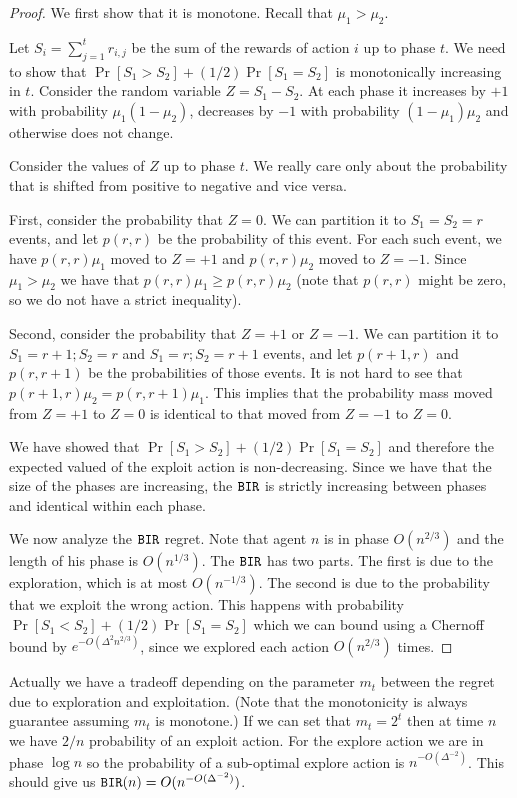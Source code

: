 \begin{proof}
We first show that it is monotone. Recall that $\mu_1>\mu_2$. 

Let
$S_i=\sum_{j=1}^t r_{i,j}$ be the sum of the rewards of action $i$
up to phase $t$. We need to show that $\Pr[S_1>S_2]+ (1/2)
\Pr[S_1=S_2]$ is monotonically increasing in $t$. Consider the
random variable $Z=S_1-S_2$. At each phase it increases by $+1$ with
probability $\mu_1(1-\mu_2)$, decreases by $-1$ with probability
$(1-\mu_1)\mu_2$ and otherwise does not change.

Consider the values of $Z$ up to phase $t$. We really care only
about the probability that is shifted from positive to negative and
vice versa.

First, consider the probability that $Z=0$. We can partition it to
$S_1=S_2=r$ events, and let $p(r,r)$ be the probability of this
event. For each such event, we have $p(r,r)\mu_1$ moved to $Z=+1$
and $p(r,r)\mu_2$ moved to $Z=-1$. Since $\mu_1>\mu_2$ we have that
$p(r,r)\mu_1\geq p(r,r)\mu_2$ (note that $p(r,r)$ might be zero, so
we do not have a strict inequality).

Second, consider the probability that $Z=+1$ or $Z=-1$. We can
partition it to $S_1=r+1;S_2=r$ and $S_1=r;S_2=r+1$ events, and let
$p(r+1,r)$ and $p(r,r+1)$ be the probabilities of those events.
%
It is not hard to see that $p(r+1,r)\mu_2=p(r,r+1)\mu_1$.
%
This implies that the probability mass moved from $Z=+1$ to $Z=0$ is
identical to that moved from $Z=-1$ to $Z=0$.

We have showed that $\Pr[S_1>S_2]+ (1/2) \Pr[S_1=S_2]$ and therefore
the expected valued of the exploit action is non-decreasing. Since
we have that the size of the phases are increasing, the $\mathtt{BIR}$ is
strictly increasing between phases and identical within each phase.

We now analyze the $\mathtt{BIR}$ regret. Note that agent $n$ is in phase
$O(n^{2/3})$ and the length of his phase is $O(n^{1/3})$. The $\mathtt{BIR}$
has two parts. The first is due to the exploration, which is at most
$O(n^{-1/3})$. The second is due to the probability that we exploit
the wrong action. This happens with probability $\Pr[S_1<S_2]+ (1/2)
\Pr[S_1=S_2]$ which we can bound using a Chernoff bound by
$e^{-O(\Delta^2n^{2/3})}$, since we explored each action
$O(n^{2/3})$ times.
\end{proof}

\begin{remark}
Actually we have a tradeoff depending on the parameter $m_t$ between
the regret due to exploration and exploitation. (Note that the
monotonicity is always guarantee assuming $m_t$ is monotone.) If we
can set that $m_t = 2^t$ then at time $n$ we have $2/ n$ probability
of an exploit action. For the explore action we are in phase $\log
n$ so the probability of a sub-optimal explore action is
$n^{-O(\Delta^{-2})}$. This should give us
$\mathtt{BIR}(n)=O(n^{-O(\Delta^{-2})})$.
\end{remark}


